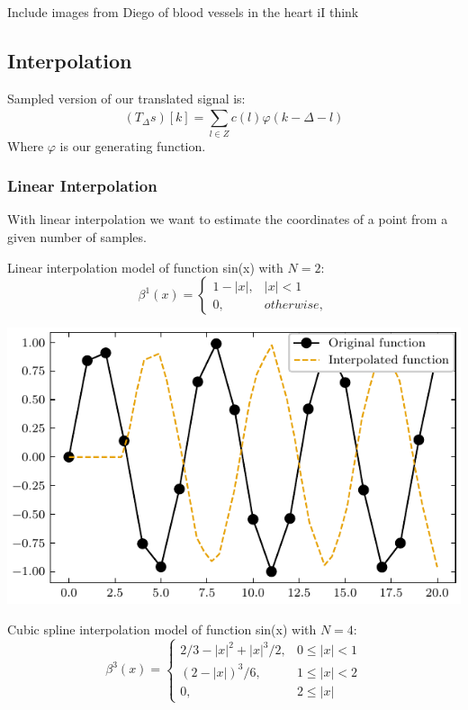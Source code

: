 \documentclass[]{usiinfbachelorproject}
\begin{document}
	
	Include images from Diego of blood vessels in the heart iI think
	
	
	\iffalse
	
	\subsection{Interpolation}
	Sampled version of our translated signal is:
	\begin{equation}
		(T_\Delta s)[k] = \sum_{l \in Z}^{} c(l)\varphi(k - \Delta - l)
	\end{equation}
	Where $\varphi$ is our generating function.
	\subsubsection{Linear Interpolation}
	With linear interpolation we want to estimate the coordinates of a point from a given number of samples. 
	
	Linear interpolation model of function sin(x) with $N = 2$:
	\begin{equation}
		\beta^1(x) = 
		\begin{cases}
			1 - |x|, & |x| < 1    \\
			0,       & otherwise, 
		\end{cases}
	\end{equation}
	\begin{center}
		\includegraphics{"images/linear_interpolation_example.pdf"}
	\end{center}
	
	Cubic spline interpolation model of function sin(x) with $N=4$:
	\begin{equation}
		\beta^3(x) = 
		\begin{cases}
			2/3 - |x|^2 + |x|^3/2, & 0 \leq|x| < 1  \\
			(2-|x|)^3/6,           & 1 \leq |x| < 2 \\
			0,                     & 2 \leq |x|     
		\end{cases}
	\end{equation} \cite{main_article}
	
\end{document}
